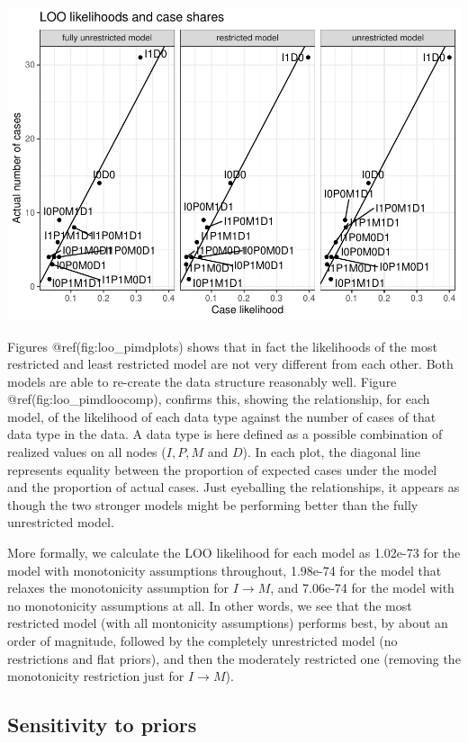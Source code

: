 \documentclass[
  12pt,
]{book}
\begin{document}
\includegraphics{ii_files/figure-latex/pimdloocomp-1.pdf}

Figures @ref(fig:loo\_pimdplots) shows that in fact the likelihoods of the most restricted and least restricted model are not very different from each other. Both models are able to re-create the data structure reasonably well. Figure @ref(fig:loo\_pimdloocomp), confirms this, showing the relationship, for each model, of the likelihood of each data type against the number of cases of that data type in the data. A data type is here defined as a possible combination of realized values on all nodes (\(I, P, M\) and \(D\)). In each plot, the diagonal line represents equality between the proportion of expected cases under the model and the proportion of actual cases. Just eyeballing the relationships, it appears as though the two stronger models might be performing better than the fully unrestricted model.

More formally, we calculate the LOO likelihood for each model as 1.02e-73 for the model with monotonicity assumptions throughout, 1.98e-74 for the model that relaxes the monotonicity assumption for \(I \rightarrow M\), and 7.06e-74 for the model with no monotonicity assumptions at all. In other words, we see that the most restricted model (with all montonicity assumptions) performs best, by about an order of magnitude, followed by the completely unrestricted model (no restrictions and flat priors), and then the moderately restricted one (removing the monotonicity restriction just for \(I \rightarrow M\)).

\hypertarget{sensitivity-to-priors}{%
\subsection{Sensitivity to priors}\label{sensitivity-to-priors}}
\end{document}
